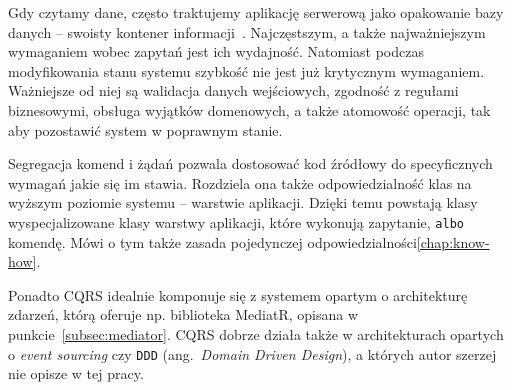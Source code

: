 Gdy czytamy dane, często traktujemy aplikację serwerową jako opakowanie bazy danych -- swoisty kontener informacji~\cite{cqrs-fowler}. Najczęstszym, a także najważniejszym wymaganiem wobec zapytań jest ich wydajność. Natomiast podczas modyfikowania stanu systemu szybkość nie jest już krytycznym wymaganiem. Ważniejsze od niej są walidacja danych wejściowych, zgodność z regułami biznesowymi, obsługa wyjątków domenowych, a także atomowość operacji, tak aby pozostawić system w poprawnym stanie.

Segregacja komend i żądań pozwala dostosować kod źródłowy do specyficznych wymagań jakie się im stawia. Rozdziela ona także odpowiedzialność klas na wyższym poziomie systemu -- warstwie aplikacji. Dzięki temu powstają klasy wyspecjalizowane klasy warstwy aplikacji, które wykonują zapytanie, \texttt{albo} komendę. Mówi o tym także zasada pojedynczej odpowiedzialności\ref{chap:know-how}.

Ponadto CQRS idealnie komponuje się z systemem opartym o architekturę zdarzeń, którą oferuje np. biblioteka MediatR, opisana w punkcie~\ref{subsec:mediator}. CQRS dobrze działa także w architekturach opartych o \emph{event sourcing} czy \texttt{DDD} (ang.~\emph{Domain Driven Design}), a których autor szerzej nie opisze w tej pracy.